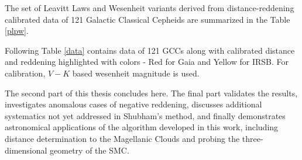 The set of Leavitt Laws and Wesenheit variants derived from distance-reddening calibrated data of 121 Galactic Classical Cepheids are summarized in the Table \ref{plpw}.



Following Table \ref{data} contains data of 121 GCCs along with calibrated distance and reddening highlighted with colors - Red for Gaia and Yellow for IRSB. For calibration, $V-K$ based wesenheit magnitude is used. 


The second part of this thesis concludes here. The final part validates the results, investigates anomalous cases of negative reddening, discusses additional systematics not yet addressed in Shubham's method, and finally demonstrates  astronomical applications of the algorithm developed in this work, including distance determination to the Magellanic Clouds and probing the three-dimensional geometry of the SMC.